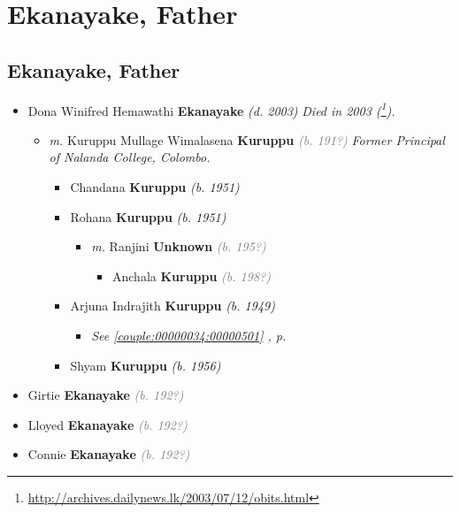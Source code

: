 \documentclass[10pt, openany]{book}
\begin{document}
\part{Ekanayake, Father}
\chapter{Ekanayake, Father}
\label{00002531}
\textcolor{slmaroon}{\textit{}}
\begin{itemize}
\item{Dona Winifred Hemawathi \textbf{Ekanayake} \textcolor{slorange}{\textit{(d. 2003)}} \textcolor{slmaroon}{\textit{Died in 2003 (\footnote{\url{http://archives.dailynews.lk/2003/07/12/obits.html}}).}}
\begin{itemize}
\item{\textit{m.} Kuruppu Mullage Wimalasena \textbf{Kuruppu} \textcolor{gray}{\textit{(b. 191?)}} \textcolor{slmaroon}{\textit{Former Principal of Nalanda College, Colombo.}}   \label{couple:00000196:00000505} \begin{itemize}
\item{Chandana \textbf{Kuruppu} \textcolor{slorange}{\textit{(b. 1951)}}
 }
\item{Rohana \textbf{Kuruppu} \textcolor{slorange}{\textit{(b. 1951)}}
\begin{itemize}
\item{\textit{m.} Ranjini \textbf{Unknown} \textcolor{gray}{\textit{(b. 195?)}}   \label{couple:00000508:00000901} \begin{itemize}
\item{Anchala \textbf{Kuruppu} \textcolor{gray}{\textit{(b. 198?)}}
 }
\end{itemize}}
\end{itemize}
 }
\item{Arjuna Indrajith \textbf{Kuruppu} \textcolor{slorange}{\textit{(b. 1949)}}
\begin{itemize}
\item{\textcolor{slteal}{\textit{See  \autoref{couple:00000034:00000501} \textit{, p. \pageref{couple:00000034:00000501} }}}}
\end{itemize}
  }
\item{Shyam \textbf{Kuruppu} \textcolor{slorange}{\textit{(b. 1956)}}
 }
\end{itemize}}
\end{itemize}
   }
\item{Girtie \textbf{Ekanayake} \textcolor{gray}{\textit{(b. 192?)}}
 }
\item{Lloyed  \textbf{Ekanayake} \textcolor{gray}{\textit{(b. 192?)}}
  }
\item{Connie \textbf{Ekanayake} \textcolor{gray}{\textit{(b. 192?)}}
 }
\end{itemize}
 
\end{document}
